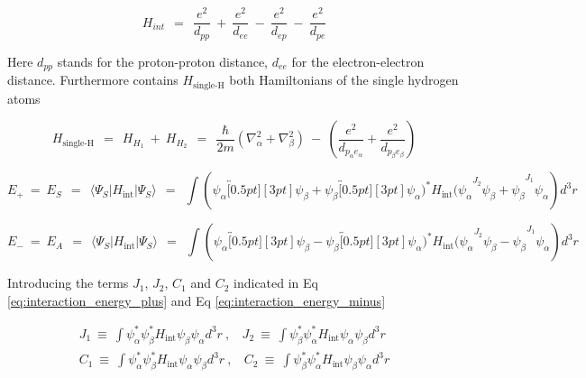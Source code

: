 \documentclass[10pt]{report}
\numberwithin{equation}{chapter}
\newcommand{\refEq}[1]{
  Eq  \ref{#1}
}
\begin{document}
\begin{equation}
  H_{int} ~~=~~ \frac{e^2}{d_{pp}} ~+~ \frac{e^2}{d_{ee}} ~-~ \frac{e^2}{d_{ep}} ~-~ \frac{e^2}{d_{pe}}
\end{equation}

Here $d_{pp}$ stands for the proton-proton distance, $d_{ee}$ for the electron-electron distance.
Furthermore contains $H_\text{single-H}$ both Hamiltonians of the single hydrogen atoms

\begin{equation}
  H_\text{single-H} ~~=~~ H_{H_1} ~+~ H_{H_2} ~~=~~ 
  \frac{\hbar}{2m} \left( \nabla^2_\alpha + \nabla^2_\beta \right) ~-~ 
  \left(\frac{e^2}{d_{p_\alpha e_\alpha}} + \frac{e^2}{d_{p_\beta e_\beta}} \right)
\end{equation}


\begin{equation} \label{eq:interaction_energy_plus}
  E_+ ~=~E_S ~~=~~ \langle \Psi_S | H_\text{int} | \Psi_S \rangle ~~=~~
  \int ( \psi_\alpha \overbracket[0.5pt][3pt]{ \psi_\beta + \psi_\beta \overbracket[0.5pt][3pt]{ \psi_\alpha )^* H_\text{int} 
  ( \psi_\alpha }^{J_2} \psi_\beta + \psi_\beta}^{J_1}  \psi_\alpha ) d^3r
\end{equation}



\begin{equation} \label{eq:interaction_energy_minus}
  E_- ~=~E_A ~~=~~ \langle \Psi_S | H_\text{int} | \Psi_S \rangle ~~=~~
  \int ( \psi_\alpha \overbracket[0.5pt][3pt]{ \psi_\beta - \psi_\beta \overbracket[0.5pt][3pt]{ \psi_\alpha )^* H_\text{int} 
  ( \psi_\alpha }^{J_2} \psi_\beta - \psi_\beta}^{J_1} \psi_\alpha ) d^3r
\end{equation}


Introducing the terms $J_1$, $J_2$, $C_1$ and $C_2$ indicated in \refEq{eq:interaction_energy_plus} and \refEq{eq:interaction_energy_minus}

\begin{align}
  J_1 ~\equiv~ \int \psi_\alpha^* \psi_\beta^* H_\text{int} \psi_\beta \psi_\alpha d^3r ~,~~~~
  J_2 ~\equiv~ \int \psi_\beta^* \psi_\alpha^* H_\text{int} \psi_\alpha \psi_\beta d^3r \\
  C_1 ~\equiv~ \int \psi_\alpha^* \psi_\beta^* H_\text{int} \psi_\alpha \psi_\beta d^3r ~,~~~~
  C_2 ~\equiv~ \int \psi_\beta^* \psi_\alpha^* H_\text{int} \psi_\beta \psi_\alpha d^3r
\end{align}
\end{document}
